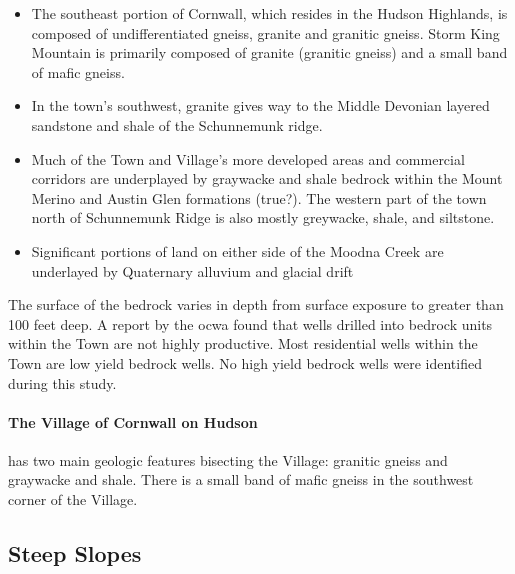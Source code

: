\begin{itemize}
    \item The southeast portion of Cornwall, which resides in the Hudson 
Highlands, is composed of undifferentiated gneiss, granite and granitic gneiss. 
Storm King Mountain is primarily composed of granite (granitic gneiss) and a 
small band of mafic gneiss.
    \item In the town's southwest, granite gives way to the Middle Devonian 
layered sandstone and shale of the Schunnemunk ridge.
  \item Much of the Town and Village’s more developed areas and commercial corridors 
    are underplayed by graywacke and shale bedrock within the Mount Merino and 
    Austin Glen formations (true?). The western part of the town north of 
    Schunnemunk Ridge is also mostly greywacke, shale, and siltstone.
    \item Significant portions of land on either side of the Moodna Creek are 
    underlayed by Quaternary alluvium and glacial drift
\end{itemize}
The surface of the bedrock varies in depth from surface exposure to greater 
than 100 feet deep. A report by the \gls{ocwa} found that 
wells drilled into bedrock units within the Town are not highly productive. 
Most residential wells within the Town are low yield bedrock wells. No high 
yield bedrock wells were identified during this study.

\paragraph{The Village of Cornwall on Hudson} has two main geologic features bisecting the 
Village: granitic gneiss and graywacke and shale. There is a small band of 
mafic gneiss in the southwest corner of the Village.

\subsection{Steep Slopes}\label{subsec:steepsloes}
